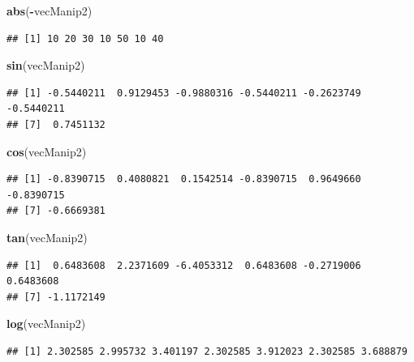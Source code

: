 \documentclass[]{book}
\newenvironment{Shaded}{\begin{snugshade}}{\end{snugshade}}
\newcommand{\KeywordTok}[1]{\textcolor[rgb]{0.13,0.29,0.53}{\textbf{#1}}}
\newcommand{\NormalTok}[1]{#1}
\newcommand{\OperatorTok}[1]{\textcolor[rgb]{0.81,0.36,0.00}{\textbf{#1}}}
\begin{document}
\begin{Shaded}
\begin{Highlighting}[]
\KeywordTok{abs}\NormalTok{(}\OperatorTok{-}\NormalTok{vecManip2)}
\end{Highlighting}
\end{Shaded}

\begin{verbatim}
## [1] 10 20 30 10 50 10 40
\end{verbatim}

\begin{Shaded}
\begin{Highlighting}[]
\KeywordTok{sin}\NormalTok{(vecManip2)}
\end{Highlighting}
\end{Shaded}

\begin{verbatim}
## [1] -0.5440211  0.9129453 -0.9880316 -0.5440211 -0.2623749 -0.5440211
## [7]  0.7451132
\end{verbatim}

\begin{Shaded}
\begin{Highlighting}[]
\KeywordTok{cos}\NormalTok{(vecManip2)}
\end{Highlighting}
\end{Shaded}

\begin{verbatim}
## [1] -0.8390715  0.4080821  0.1542514 -0.8390715  0.9649660 -0.8390715
## [7] -0.6669381
\end{verbatim}

\begin{Shaded}
\begin{Highlighting}[]
\KeywordTok{tan}\NormalTok{(vecManip2)}
\end{Highlighting}
\end{Shaded}

\begin{verbatim}
## [1]  0.6483608  2.2371609 -6.4053312  0.6483608 -0.2719006  0.6483608
## [7] -1.1172149
\end{verbatim}

\begin{Shaded}
\begin{Highlighting}[]
\KeywordTok{log}\NormalTok{(vecManip2)}
\end{Highlighting}
\end{Shaded}

\begin{verbatim}
## [1] 2.302585 2.995732 3.401197 2.302585 3.912023 2.302585 3.688879
\end{verbatim}
\end{document}
